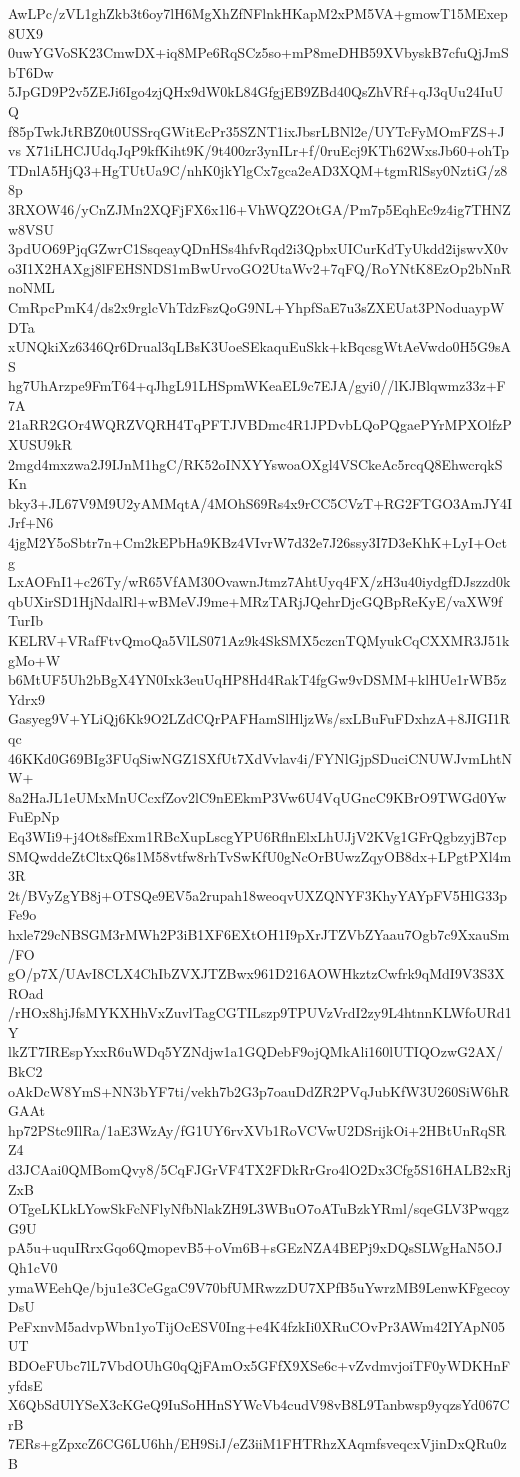 AwLPc/zVL1ghZkb3t6oy7lH6MgXhZfNFlnkHKapM2xPM5VA+gmowT15MExep8UX9
0uwYGVoSK23CmwDX+iq8MPe6RqSCz5so+mP8meDHB59XVbyskB7cfuQjJmSbT6Dw
5JpGD9P2v5ZEJi6Igo4zjQHx9dW0kL84GfgjEB9ZBd40QsZhVRf+qJ3qUu24IuUQ
f85pTwkJtRBZ0t0USSrqGWitEcPr35SZNT1ixJbsrLBNl2e/UYTcFyMOmFZS+Jvs
X71iLHCJUdqJqP9kfKiht9K/9t400zr3ynILr+f/0ruEcj9KTh62WxsJb60+ohTp
TDnlA5HjQ3+HgTUtUa9C/nhK0jkYlgCx7gca2eAD3XQM+tgmRlSsy0NztiG/z88p
3RXOW46/yCnZJMn2XQFjFX6x1l6+VhWQZ2OtGA/Pm7p5EqhEc9z4ig7THNZw8VSU
3pdUO69PjqGZwrC1SsqeayQDnHSs4hfvRqd2i3QpbxUICurKdTyUkdd2ijswvX0v
o3I1X2HAXgj8lFEHSNDS1mBwUrvoGO2UtaWv2+7qFQ/RoYNtK8EzOp2bNnRnoNML
CmRpcPmK4/ds2x9rglcVhTdzFszQoG9NL+YhpfSaE7u3sZXEUat3PNoduaypWDTa
xUNQkiXz6346Qr6Drual3qLBsK3UoeSEkaquEuSkk+kBqcsgWtAeVwdo0H5G9sAS
hg7UhArzpe9FmT64+qJhgL91LHSpmWKeaEL9c7EJA/gyi0//lKJBlqwmz33z+F7A
21aRR2GOr4WQRZVQRH4TqPFTJVBDmc4R1JPDvbLQoPQgaePYrMPXOlfzPXUSU9kR
2mgd4mxzwa2J9IJnM1hgC/RK52oINXYYswoaOXgl4VSCkeAc5rcqQ8EhwcrqkSKn
bky3+JL67V9M9U2yAMMqtA/4MOhS69Rs4x9rCC5CVzT+RG2FTGO3AmJY4IJrf+N6
4jgM2Y5oSbtr7n+Cm2kEPbHa9KBz4VIvrW7d32e7J26ssy3I7D3eKhK+LyI+Octg
LxAOFnI1+c26Ty/wR65VfAM30OvawnJtmz7AhtUyq4FX/zH3u40iydgfDJszzd0k
qbUXirSD1HjNdalRl+wBMeVJ9me+MRzTARjJQehrDjcGQBpReKyE/vaXW9fTurIb
KELRV+VRafFtvQmoQa5VlLS071Az9k4SkSMX5czcnTQMyukCqCXXMR3J51kgMo+W
b6MtUF5Uh2bBgX4YN0Ixk3euUqHP8Hd4RakT4fgGw9vDSMM+klHUe1rWB5zYdrx9
Gasyeg9V+YLiQj6Kk9O2LZdCQrPAFHamSlHljzWs/sxLBuFuFDxhzA+8JIGI1Rqc
46KKd0G69BIg3FUqSiwNGZ1SXfUt7XdVvlav4i/FYNlGjpSDuciCNUWJvmLhtNW+
8a2HaJL1eUMxMnUCcxfZov2lC9nEEkmP3Vw6U4VqUGncC9KBrO9TWGd0YwFuEpNp
Eq3WIi9+j4Ot8sfExm1RBcXupLscgYPU6RflnElxLhUJjV2KVg1GFrQgbzyjB7cp
SMQwddeZtCltxQ6s1M58vtfw8rhTvSwKfU0gNcOrBUwzZqyOB8dx+LPgtPXl4m3R
2t/BVyZgYB8j+OTSQe9EV5a2rupah18weoqvUXZQNYF3KhyYAYpFV5HlG33pFe9o
hxle729cNBSGM3rMWh2P3iB1XF6EXtOH1I9pXrJTZVbZYaau7Ogb7c9XxauSm/FO
gO/p7X/UAvI8CLX4ChIbZVXJTZBwx961D216AOWHkztzCwfrk9qMdI9V3S3XROad
/rHOx8hjJfsMYKXHhVxZuvlTagCGTILszp9TPUVzVrdI2zy9L4htnnKLWfoURd1Y
lkZT7IREspYxxR6uWDq5YZNdjw1a1GQDebF9ojQMkAli160lUTIQOzwG2AX/BkC2
oAkDcW8YmS+NN3bYF7ti/vekh7b2G3p7oauDdZR2PVqJubKfW3U260SiW6hRGAAt
hp72PStc9IlRa/1aE3WzAy/fG1UY6rvXVb1RoVCVwU2DSrijkOi+2HBtUnRqSRZ4
d3JCAai0QMBomQvy8/5CqFJGrVF4TX2FDkRrGro4lO2Dx3Cfg5S16HALB2xRjZxB
OTgeLKLkLYowSkFcNFlyNfbNlakZH9L3WBuO7oATuBzkYRml/sqeGLV3PwqgzG9U
pA5u+uquIRrxGqo6QmopevB5+oVm6B+sGEzNZA4BEPj9xDQsSLWgHaN5OJQh1cV0
ymaWEehQe/bju1e3CeGgaC9V70bfUMRwzzDU7XPfB5uYwrzMB9LenwKFgecoyDsU
PeFxnvM5advpWbn1yoTijOcESV0Ing+e4K4fzkIi0XRuCOvPr3AWm42IYApN05UT
BDOeFUbc7lL7VbdOUhG0qQjFAmOx5GFfX9XSe6c+vZvdmvjoiTF0yWDKHnFyfdsE
X6QbSdUlYSeX3cKGeQ9IuSoHHnSYWcVb4cudV98vB8L9Tanbwsp9yqzsYd067CrB
7ERs+gZpxcZ6CG6LU6hh/EH9SiJ/eZ3iiM1FHTRhzXAqmfsveqcxVjinDxQRu0zB

